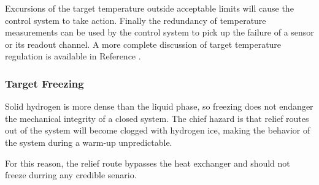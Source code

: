 Excursions of the target temperature outside acceptable limits will
cause the control system to take action. Finally the redundancy of
temperature measurements can be used by the control system to pick
up the failure of a sensor or its readout channel. A more complete
discussion of target temperature regulation is available in Reference
\cite{bi:tgts}. 

\subsubsection{Target Freezing}

\begin{safetyen}{10}{5} Solid hydrogen is more dense than the
liquid phase, so freezing does not endanger the mechanical integrity
of a closed system. The chief hazard is that relief routes out of
the system will become clogged with hydrogen ice, making the behavior
of the system during a warm-up unpredictable. \end{safetyen} For
this reason, the relief route bypasses the heat exchanger and should
not freeze durring any credible senario. 

